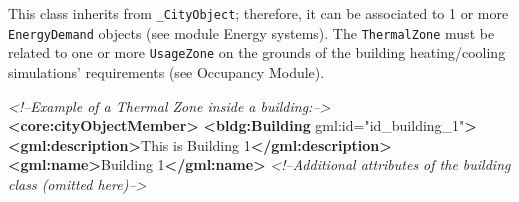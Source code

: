 \documentclass[a4paper,12pt]{article}
\newenvironment{Shaded}{}{}
\newcommand{\KeywordTok}[1]{\textcolor[rgb]{0.00,0.44,0.13}{\textbf{{#1}}}}
\newcommand{\StringTok}[1]{\textcolor[rgb]{0.25,0.44,0.63}{{#1}}}
\newcommand{\CommentTok}[1]{\textcolor[rgb]{0.38,0.63,0.69}{\textit{{#1}}}}
\newcommand{\OtherTok}[1]{\textcolor[rgb]{0.00,0.44,0.13}{{#1}}}
\newcommand{\NormalTok}[1]{{#1}}
\begin{document}
This class inherits from \texttt{\_CityObject}; therefore, it can be
associated to 1 or more \texttt{EnergyDemand} objects (see module Energy
systems). The \texttt{ThermalZone} must be related to one or more
\texttt{UsageZone} on the grounds of the building heating/cooling
simulations' requirements (see Occupancy Module).

\begin{Shaded}
\begin{Highlighting}[]
\CommentTok{<!--Example of a Thermal Zone inside a building:-->}
\KeywordTok{<core:cityObjectMember>}
    \KeywordTok{<bldg:Building}\OtherTok{ gml:id=}\StringTok{"id_building_1"}\KeywordTok{>}
        \KeywordTok{<gml:description>}\NormalTok{This is Building 1}\KeywordTok{</gml:description>}
        \KeywordTok{<gml:name>}\NormalTok{Building 1}\KeywordTok{</gml:name>}
        \CommentTok{<!--Additional attributes of the building class (omitted here)-->}


\end{Highlighting}
\end{Shaded}
\end{document}
